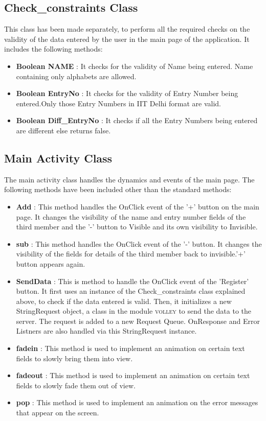 \documentclass{article}
\begin{document}
\subsection{Check\_constraints Class}
\par\noindent This class has been made separately, to perform all the required checks on the validity of the data entered by the user in the main page of the application. It includes the following methods:
\begin{itemize}
\item\textbf{Boolean NAME} : It checks for the validity of Name being entered. Name containing only alphabets are allowed.
\item\textbf{Boolean EntryNo} : It checks for the validity of Entry Number being entered.Only those Entry Numbers in IIT Delhi format are valid.
\item\textbf{Boolean Diff\_EntryNo} : It checks if all the Entry Numbers being entered are different else returns false.
\end{itemize}



\subsection{Main Activity Class}
\par\noindent The main activity class handles the dynamics and events of the main page. The following methods have been included other than the standard methods:
\begin{itemize}
\item \textbf{Add} : This method handles the OnClick event of the '+' button on the main page. It changes the visibility of the name and entry number fields of the third member and the '-' button to Visible and its own visibility to Invisible.
\item \textbf{sub} : This method handles the OnClick event of the '-' button. It changes the visibility of the fields for details of the third member back to invisible.'+' button appears again.
\item \textbf{SendData} : This is method to handle the OnClick event of the 'Register' button. It first uses an instance of the Check\_constraints class explained above, to check if the data entered is valid. Then, it initializes a new StringRequest object, a class in the module \textsc{volley} to send the data to the server. The request is added to a new Request Queue.
OnResponse and Error Listners are also handled via this StringRequest instance.
\item \textbf{fadein} : This method is used to implement an animation on certain text fields to slowly bring them into view.
\item \textbf{fadeout} : This method is used to implement an animation on certain text fields to slowly fade them out of view.
\item \textbf{pop} : This method is used to implement an animation on the error messages that appear on the screen.
\end{itemize}
\end{document}
